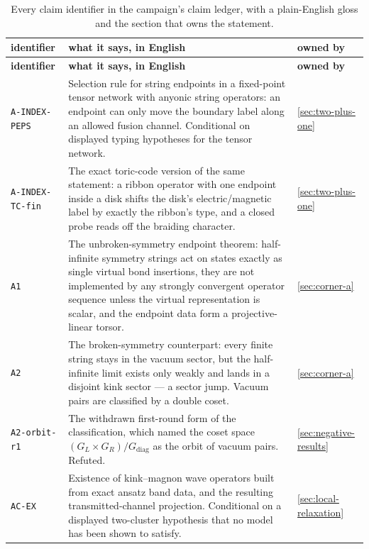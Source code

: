 {\footnotesize
\begin{longtable}{@{}p{}p{}p{}@{}}
\caption{Every claim identifier in the campaign's claim ledger, with a
plain-English gloss and the section that owns the statement.}
\label{tab:dict-claims}\\
\toprule
\textbf{identifier} & \textbf{what it says, in English} & \textbf{owned by}\\
\midrule
\endfirsthead
\toprule
\textbf{identifier} & \textbf{what it says, in English} & \textbf{owned by}\\
\midrule
\endhead
\bottomrule
\endfoot

\texttt{A-INDEX-PEPS} & Selection rule for string endpoints in a
fixed-point tensor network with anyonic string operators: an endpoint can
only move the boundary label along an allowed fusion channel. Conditional on
displayed typing hypotheses for the tensor network. & \cref{sec:two-plus-one}\\

\texttt{A-INDEX-TC-fin} & The exact toric-code version of the same statement:
a ribbon operator with one endpoint inside a disk shifts the disk's
electric/magnetic label by exactly the ribbon's type, and a closed probe reads
off the braiding character. & \cref{sec:two-plus-one}\\

\texttt{A1} & The unbroken-symmetry endpoint theorem: half-infinite symmetry
strings act on states exactly as single virtual bond insertions, they are not
implemented by any strongly convergent operator sequence unless the virtual
representation is scalar, and the endpoint data form a projective-linear
torsor. & \cref{sec:corner-a}\\

\texttt{A2} & The broken-symmetry counterpart: every finite string stays in
the vacuum sector, but the half-infinite limit exists only weakly and lands
in a disjoint kink sector --- a sector jump. Vacuum pairs are classified by a
double coset. & \cref{sec:corner-a}\\

\texttt{A2-orbit-r1} & The withdrawn first-round form of the classification,
which named the coset space $(G_L\times G_R)/G_{\mathrm{diag}}$ as the orbit
of vacuum pairs. Refuted. & \cref{sec:negative-results}\\

\texttt{AC-EX} & Existence of kink--magnon wave operators built from exact
ansatz band data, and the resulting transmitted-channel projection.
Conditional on a displayed two-cluster hypothesis that no model has been shown
to satisfy. & \cref{sec:local-relaxation}\\


\end{longtable}}
